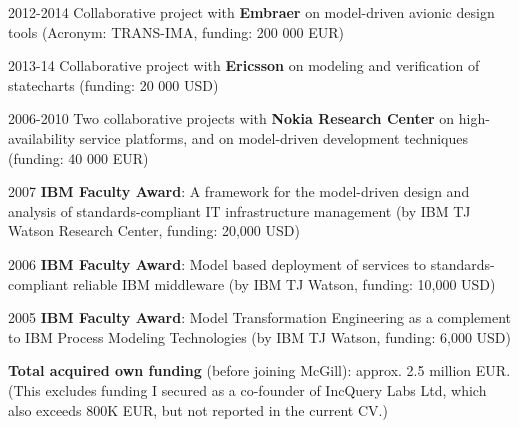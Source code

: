 \begin{yearlist}
\item[2012-2014] Collaborative project with \textbf{Embraer} on model-driven avionic design tools (Acronym: TRANS-IMA, funding: 200 000 EUR) 
\item[2013-14] Collaborative project with \textbf{Ericsson} on modeling and verification of statecharts (funding: 20 000 USD)
\item[2006-2010] Two collaborative projects with \textbf{Nokia Research Center}
on high-availability service platforms, and on model-driven development techniques (funding: 40 000 EUR)
\item[2007] \textbf{IBM Faculty Award}: A framework for the model-driven design and analysis of standards-compliant IT infrastructure management (by IBM TJ Watson Research Center, funding: 20,000 USD)  
\item[2006] \textbf{IBM Faculty Award}: Model based deployment of services to standards-compliant reliable IBM middleware (by IBM TJ Watson, funding: 10,000 USD) 
\item[2005] \textbf{IBM Faculty Award}: Model Transformation Engineering as a complement to IBM Process Modeling Technologies (by IBM TJ Watson, funding: 6,000 USD)  
\end{yearlist}



\textbf{Total acquired own funding} (before joining McGill): approx. 2.5 million EUR. \\
(This excludes funding I secured as a co-founder of IncQuery Labs Ltd, which also exceeds 800K EUR, but not reported in the current CV.)



